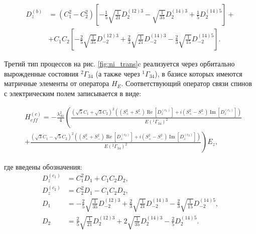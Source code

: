 \begin{equation}
	\label{eq:NiDzB}
	\begin{aligned}
		D_{z}^{(b)} & =\left(C_{1}^{2}-C_{2}^{2}\right)\left[-\frac{1}{5} \sqrt{\frac{1}{21}} D_{2}^{(12) 3}-\sqrt{\frac{1}{35}} D_{2}^{(14) 3} +\frac{1}{5} D_{2}^{(14) 5}\right] + \\
		& + C_{1} C_{2}\left[-\frac{2}{5} \sqrt{\frac{1}{35}} D_{-2}^{(12) 3}+\frac{2}{3} \sqrt{\frac{1}{21}} D_{-2}^{(14) 3}-\frac{2}{3} \sqrt{\frac{1}{15}} D_{-2}^{(14) 5}\right].
	\end{aligned}
\end{equation}

Третий тип процессов на рис. \cref{fig:ni_trans}c реализуется через  орбитально вырожденные состояния $^{2}\Gamma_{34}$ (а также через  $^{1}\Gamma_{34}$), в базисе которых имеются матричные элементы от оператора $H_{E}$.  Соответствующий оператор связи спинов с электрическим полем записывается в виде:

\begin{equation}
	\label{eq:NiHeffC}
	\begin{aligned}
		& H_{eff}^{(c)}=  -\frac{\lambda_{Ni}^{2}}{4}\left(\frac{\left(\sqrt{5} C_{1}+\sqrt{3} C_{2}\right)^{2}\left(\left(S_{+}^{2}+S_{-}^{2}\right) \operatorname{Re}\left[D_{z}^{\left(c_{1}\right)}\right]+i\left(S_{+}^{2}-S_{-}^{2}\right) \operatorname{Im}\left[D_{z}^{\left(c_{1}\right)}\right]\right)}{E\left({ }^{1} \Gamma_{34}\right)^{2}}\right. \\
		& \left.+\frac{\left(\sqrt{3} C_{1}-\sqrt{5} C_{2}\right)^{2}\left(\left(S_{+}^{2}+S_{-}^{2}\right) \operatorname{Re}\left[D_{z}^{\left(c_{2}\right)}\right]+i\left(S_{+}^{2}-S_{-}^{2}\right) \operatorname{Im}\left[D_{z}^{\left(c_{2}\right)}\right]\right)}{E\left({ }^{2} \Gamma_{34}\right)^{2}}\right) E_{z},
	\end{aligned}
\end{equation}

где введены обозначения:
\begin{equation}
	\label{eq:NiDzC}
	\begin{aligned}
		D_{z}^{\left(c_{1}\right)} & = C_{1}^{2}D_{1}+C_{1} C_{2}D_{2}, \\
		D_{z}^{\left(c_{2}\right)} & = C_{2}^{2}D_{1}-C_{1} C_{2}D_{2},\\
		D_{1} & = -\frac{2}{5} \sqrt{\frac{1}{35}} D_{-2}^{(12) 3}+\frac{2}{3} \sqrt{\frac{1}{21}} D_{-2}^{(14) 3}-\frac{2}{3} \sqrt{\frac{1}{15}} D_{-2}^{(14) 5}, \\
		D_{2} & = \frac{2}{5} \sqrt{\frac{1}{21}} D_{2}^{(12) 3}+2 \sqrt{\frac{1}{35}} D_{2}^{(14) 3}-\frac{2}{5} D_{2}^{(14) 5}.
	\end{aligned}
\end{equation}

